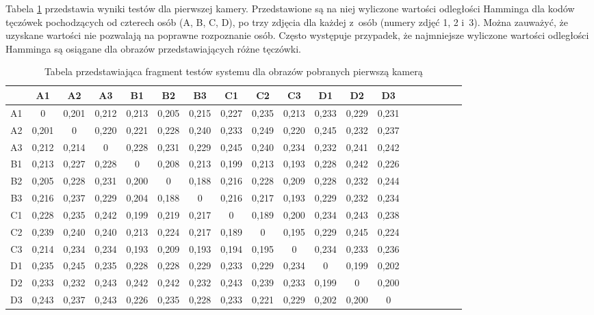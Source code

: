 Tabela \ref{tab:pierwsza} przedstawia wyniki testów dla pierwszej kamery. Przedstawione są na niej wyliczone wartości odległości Hamminga dla kodów tęczówek pochodzących od czterech osób (A, B, C, D), po trzy zdjęcia dla każdej z~osób (numery zdjęć 1, 2 i~3). Można zauważyć, że uzyskane wartości nie pozwalają na poprawne rozpoznanie osób. Często występuje przypadek, że najmniejsze wyliczone wartości odległości Hamminga są osiągane dla obrazów przedstawiających różne tęczówki.

\begin{table}
\begin{center}
\caption{Tabela przedstawiająca fragment testów systemu dla obrazów pobranych pierwszą kamerą}
\label{tab:pierwsza}
\begin{tabular}{|c|c|c|c|c|c|c|c|c|c|c|c|c|c|c|c|c|c|c|}
\hline
 & A1 & A2 & A3 & B1 & B2 & B3 & C1 & C2 & C3 & D1 & D2 & D3\\ \hline
A1 & 0&0,201&0,212&0,213&0,205&0,215&0,227&0,235&0,213&0,233&0,229&0,231 \\ \hline
A2 & 0,201&0&0,220&0,221&0,228&0,240&0,233&0,249&0,220&0,245&0,232&0,237 \\ \hline
A3 & 0,212&0,214&0&0,228&0,231&0,229&0,245&0,240&0,234&0,232&0,241&0,242\\ \hline
B1 & 0,213&0,227&0,228&0&0,208&0,213&0,199&0,213&0,193&0,228&0,242&0,226\\ \hline
B2 & 0,205&0,228&0,231&0,200&0&0,188&0,216&0,228&0,209&0,228&0,232&0,244\\ \hline
B3 & 0,216&0,237&0,229&0,204&0,188&0&0,216&0,217&0,193&0,229&0,232&0,234\\ \hline
C1 & 0,228&0,235&0,242&0,199&0,219&0,217&0&0,189&0,200&0,234&0,243&0,238\\ \hline
C2 & 0,239&0,240&0,240&0,213&0,224&0,217&0,189&0&0,195&0,229&0,245&0,224\\ \hline
C3 & 0,214&0,234&0,234&0,193&0,209&0,193&0,194&0,195&0&0,234&0,233&0,236\\ \hline
D1 & 0,235&0,245&0,235&0,228&0,228&0,229&0,233&0,229&0,234&0&0,199&0,202\\ \hline
D2 & 0,233&0,232&0,243&0,242&0,242&0,232&0,243&0,239&0,233&0,199&0&0,200\\ \hline
D3 & 0,243&0,237&0,243&0,226&0,235&0,228&0,233&0,221&0,229&0,202&0,200&0\\ \hline
\end{tabular}
\end{center}
\end{table}

